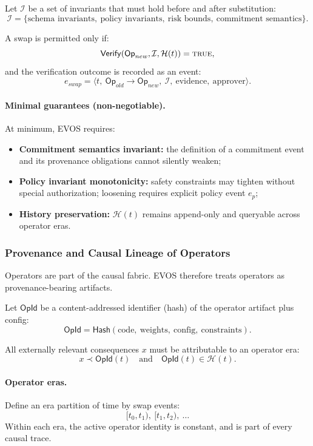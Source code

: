 \documentclass[11pt]{article}
\begin{document}
Let $\mathcal{I}$ be a set of invariants that must hold before and after substitution:
\[
\mathcal{I} = \{\text{schema invariants},\ \text{policy invariants},\ \text{risk bounds},\ \text{commitment semantics}\}.
\]

A swap is permitted only if:
\[
\mathsf{Verify}(\mathsf{Op}_{new},\mathcal{I},\mathcal{H}(t)) = \textsc{true},
\]
and the verification outcome is recorded as an event:
\[
e_{swap}=\langle t,\ \mathsf{Op}_{old}\!\rightarrow\!\mathsf{Op}_{new},\ \mathcal{I},\ \text{evidence},\ \text{approver}\rangle.
\]

\paragraph{Minimal guarantees (non-negotiable).}
At minimum, EVOS requires:
\begin{itemize}
  \item \textbf{Commitment semantics invariant:} the definition of a commitment event and its provenance obligations cannot silently weaken;
  \item \textbf{Policy invariant monotonicity:} safety constraints may tighten without special authorization; loosening requires explicit policy event $e_p$;
  \item \textbf{History preservation:} $\mathcal{H}(t)$ remains append-only and queryable across operator eras.
\end{itemize}

\subsubsection{Provenance and Causal Lineage of Operators}
\label{sec:operator-provenance}

Operators are part of the causal fabric. EVOS therefore treats operators as provenance-bearing artifacts.

Let $\mathsf{OpId}$ be a content-addressed identifier (hash) of the operator artifact plus config:
\[
\mathsf{OpId} = \mathsf{Hash}(\text{code},\ \text{weights},\ \text{config},\ \text{constraints}).
\]

All externally relevant consequences $x$ must be attributable to an operator era:
\[
x \prec \mathsf{OpId}(t)\quad \text{and} \quad \mathsf{OpId}(t)\in \mathcal{H}(t).
\]

\paragraph{Operator eras.}
Define an era partition of time by swap events:
\[
[t_0,t_1),\ [t_1,t_2),\ \dots
\]
Within each era, the active operator identity is constant, and is part of every causal trace.
\end{document}
